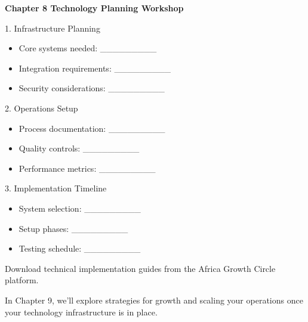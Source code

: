 \begin{workshopbox}
\textbf{Chapter 8 Technology Planning Workshop}

1. Infrastructure Planning
\begin{itemize}
    \item Core systems needed: \_\_\_\_\_\_\_\_\_
    \item Integration requirements: \_\_\_\_\_\_\_\_\_
    \item Security considerations: \_\_\_\_\_\_\_\_\_
\end{itemize}

2. Operations Setup
\begin{itemize}
    \item Process documentation: \_\_\_\_\_\_\_\_\_
    \item Quality controls: \_\_\_\_\_\_\_\_\_
    \item Performance metrics: \_\_\_\_\_\_\_\_\_
\end{itemize}

3. Implementation Timeline
\begin{itemize}
    \item System selection: \_\_\_\_\_\_\_\_\_
    \item Setup phases: \_\_\_\_\_\_\_\_\_
    \item Testing schedule: \_\_\_\_\_\_\_\_\_
\end{itemize}

Download technical implementation guides from the Africa Growth Circle platform.
\end{workshopbox}

\begin{importantbox}
In Chapter 9, we'll explore strategies for growth and scaling your operations once your technology infrastructure is in place.
\end{importantbox}